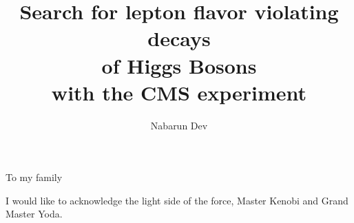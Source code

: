 \documentclass[final,numrefs,sort&compress]{nddiss2e}
\begin{document}
\newlength\cmsTabSkip
\setlength\cmsTabSkip{2ex}


\frontmatter %

\title{Search for lepton flavor violating decays \protect\\ of Higgs Bosons \protect\\ with the CMS experiment}
\author{Nabarun Dev}

\maketitle
%
%

\makepublicdomain

\begin{abstract}
\end{abstract}

\renewcommand{\dedicationname}{Dedicated to}

\begin{dedication}
  To my family
\end{dedication}

\tableofcontents
\listoffigures
\listoftables


\begin{acknowledge}
  I would like to acknowledge the light side of the force, Master Kenobi and Grand Master Yoda.
\end{acknowledge}
\end{document}
